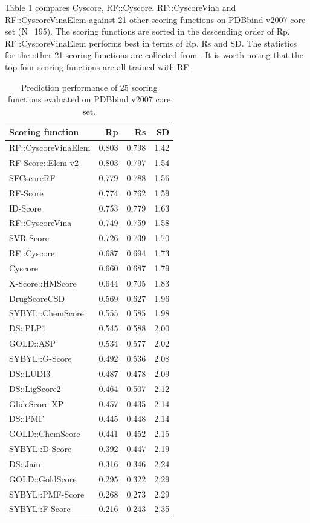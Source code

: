 Table \ref{rfcyscore:trn1105tst195} compares Cyscore, RF::Cyscore, RF::CyscoreVina and RF::CyscoreVinaElem against 21 other scoring functions on PDBbind v2007 core set (N=195). The scoring functions are sorted in the descending order of Rp. RF::CyscoreVinaElem performs best in terms of Rp, Rs and SD. The statistics for the other 21 scoring functions are collected from \citep{1362,1370,1347}. It is worth noting that the top four scoring functions are all trained with RF.

\begin{table}
\caption{Prediction performance of 25 scoring functions evaluated on PDBbind v2007 core set.}
\label{rfcyscore:trn1105tst195}
\begin{tabular}{lrrr}
\hline
Scoring function & Rp & Rs & SD\\
\hline
RF::CyscoreVinaElem & 0.803 & 0.798 & 1.42\\
RF-Score::Elem-v2 & 0.803 & 0.797 & 1.54 \\
SFCscoreRF & 0.779 & 0.788 & 1.56\\
RF-Score & 0.774 & 0.762 & 1.59\\
ID-Score & 0.753 & 0.779 & 1.63\\
RF::CyscoreVina & 0.749 & 0.759 & 1.58\\
SVR-Score & 0.726 & 0.739 & 1.70\\
RF::Cyscore & 0.687 & 0.694 & 1.73\\
Cyscore & 0.660 & 0.687 & 1.79\\
X-Score::HMScore & 0.644 & 0.705 & 1.83\\
DrugScoreCSD & 0.569 & 0.627 & 1.96\\
SYBYL::ChemScore & 0.555 & 0.585 & 1.98\\
DS::PLP1 & 0.545 & 0.588 & 2.00\\
GOLD::ASP & 0.534 & 0.577 & 2.02\\
SYBYL::G-Score & 0.492 & 0.536 & 2.08\\
DS::LUDI3 & 0.487 & 0.478 & 2.09\\
DS::LigScore2 & 0.464 & 0.507 & 2.12\\
GlideScore-XP & 0.457 & 0.435 & 2.14\\
DS::PMF & 0.445 & 0.448 & 2.14\\
GOLD::ChemScore & 0.441 & 0.452 & 2.15\\
SYBYL::D-Score & 0.392 & 0.447 & 2.19\\
DS::Jain & 0.316 & 0.346 & 2.24\\
GOLD::GoldScore & 0.295 & 0.322 & 2.29\\
SYBYL::PMF-Score & 0.268 & 0.273 & 2.29\\
SYBYL::F-Score & 0.216 & 0.243 & 2.35\\
\hline
\end{tabular}
\end{table}

